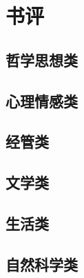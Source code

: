 \documentclass[linespread=1.5]{ctexbook}
\title{\heiti{阅读、电影}}
\author{\kaishu{北方以北}}
\begin{document}
\maketitle

\tableofcontents

\chapter{书评}

\section{哲学思想类}









\section{心理情感类}


\section{经管类}




\section{文学类}






























\section{生活类}





\section{自然科学类}



\end{document}
